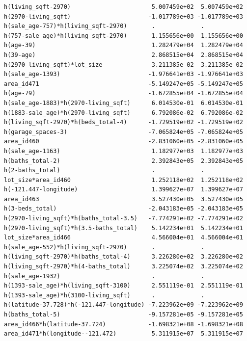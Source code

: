 \documentclass[
]{article}
\begin{document}
\begin{verbatim}
h(living_sqft-2970)                       5.007459e+02  5.007459e+02
h(2970-living_sqft)                      -1.017789e+03 -1.017789e+03
h(sale_age-757)*h(living_sqft-2970)       .             .           
h(757-sale_age)*h(living_sqft-2970)       1.155656e+00  1.155656e+00
h(age-39)                                 1.282479e+04  1.282479e+04
h(39-age)                                 2.868515e+04  2.868515e+04
h(2970-living_sqft)*lot_size              3.211385e-02  3.211385e-02
h(sale_age-1393)                         -1.976641e+03 -1.976641e+03
area_id471                               -5.149247e+05 -5.149247e+05
h(age-79)                                -1.672855e+04 -1.672855e+04
h(sale_age-1883)*h(2970-living_sqft)      6.014530e-01  6.014530e-01
h(1883-sale_age)*h(2970-living_sqft)      6.792086e-02  6.792086e-02
h(living_sqft-2970)*h(beds_total-4)      -1.729519e+02 -1.729519e+02
h(garage_spaces-3)                       -7.065824e+05 -7.065824e+05
area_id460                               -2.831060e+05 -2.831060e+05
h(sale_age-1163)                          1.182977e+03  1.182977e+03
h(baths_total-2)                          2.392843e+05  2.392843e+05
h(2-baths_total)                          .             .           
lot_size*area_id460                       1.252118e+02  1.252118e+02
h(-121.447-longitude)                     1.399627e+07  1.399627e+07
area_id463                                3.527430e+05  3.527430e+05
h(3-beds_total)                          -2.043183e+05 -2.043183e+05
h(2970-living_sqft)*h(baths_total-3.5)   -7.774291e+02 -7.774291e+02
h(2970-living_sqft)*h(3.5-baths_total)    5.142234e+01  5.142234e+01
lot_size*area_id466                       4.566004e+01  4.566004e+01
h(sale_age-552)*h(living_sqft-2970)       .             .           
h(living_sqft-2970)*h(baths_total-4)      3.226280e+02  3.226280e+02
h(living_sqft-2970)*h(4-baths_total)      3.225074e+02  3.225074e+02
h(sale_age-1932)                          .             .           
h(1393-sale_age)*h(living_sqft-3100)      2.551119e-01  2.551119e-01
h(1393-sale_age)*h(3100-living_sqft)      .             .           
h(latitude-37.728)*h(-121.447-longitude) -7.223962e+09 -7.223962e+09
h(baths_total-5)                         -9.157281e+05 -9.157281e+05
area_id466*h(latitude-37.724)            -1.698321e+08 -1.698321e+08
area_id471*h(longitude--121.472)          5.311915e+07  5.311915e+07
                                                                    

\end{verbatim}
\end{document}
